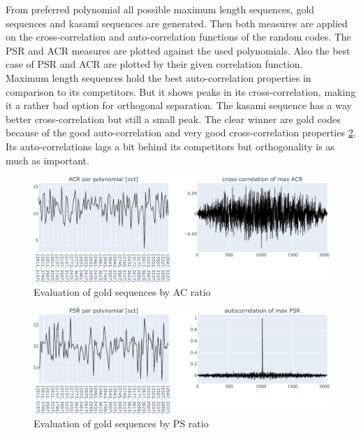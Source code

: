 From preferred polynomial all possible maximum length sequences, gold sequences and kasami sequences are generated. Then both measures are applied on the cross-correlation and auto-correlation functions of the random codes. The PSR and ACR measures are plotted against the used polynomials. Also the best case of PSR and ACR are plotted by their given correlation function.\\
Maximum length sequences hold the best auto-correlation properties in comparison to its competitors. But it shows peaks in its cross-correlation, making it a rather bad option for orthogonal separation. The kasami sequence has a way better cross-correlation but still a small peak. The clear winner are gold codes because of the good auto-correlation and very good cross-correlation properties \ref{fig:eva}. Its auto-correlations lags a bit behind its competitors but orthogonality is as much as important. 
%
%	
%
%	

\begin{figure}[h]
	\centering\includegraphics[width=13cm]{images/goldevaacr}
	
	\caption{Evaluation of gold sequences by AC ratio}
	\label{fig:eva}
\end{figure}

\begin{figure}[h]
	\centering\includegraphics[width=13cm]{images/goldevapsr}
	
	\caption{Evaluation of gold sequences by PS ratio}
	\label{fig:eva}
\end{figure}

